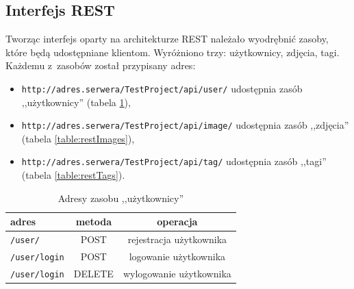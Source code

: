 \subsection{Interfejs REST}
Tworząc interfejs oparty na architekturze REST należało
wyodrębnić zasoby, które będą udostępniane klientom. Wyróżniono trzy: użytkownicy, zdjęcia, tagi. Każdemu z~zasobów
został przypisany adres:
\begin{itemize}
        \item \texttt{http://adres.serwera/TestProject/api/user/} udostępnia zasób ,,użytkownicy'' (tabela \ref{table:restUsers}),
        \item \texttt{http://adres.serwera/TestProject/api/image/} udostępnia zasób ,,zdjęcia'' (tabela \ref{table:restImages}),
        \item \texttt{http://adres.serwera/TestProject/api/tag/} udostępnia zasób ,,tagi'' (tabela \ref{table:restTags}).
\end{itemize}

\begin{table}[ht]
	\centering
	\caption{Adresy zasobu ,,użytkownicy''}
	\label{table:restUsers}
 \begin{tabular}{|l|c|c|}
	\hline 
	adres & metoda & operacja  \\
	\hline 
	\texttt{/user/} & POST &  rejestracja użytkownika  \\
	\hline 	
	\texttt{/user/login}  & POST & logowanie użytkownika  \\	
	\hline 
    \texttt{/user/login}  & DELETE & wylogowanie użytkownika \\
	\hline 
\end{tabular}
\end{table}

